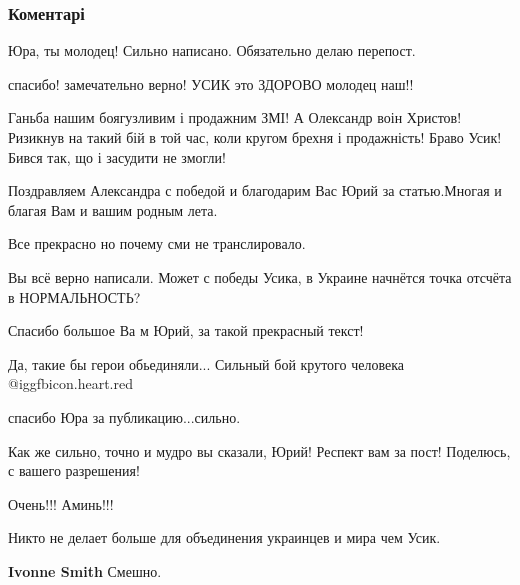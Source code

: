  
 
 
 
 
\subsubsection{Коментарі}

\begin{itemize} %
Юра, ты молодец! Сильно написано. Обязательно делаю перепост.

спасибо! замечательно верно! УСИК это ЗДОРОВО молодец наш!!


Ганьба нашим боягузливим і продажним ЗМІ! А Олександр воін Христов! Ризикнув на
такий бій в той час, коли кругом брехня і продажність! Браво Усик! Бився так,
що і засудити не змогли!


Поздравляем Александра с победой и благодарим Вас Юрий за статью.Многая и благая Вам и вашим родным лета.

Все прекрасно но почему сми не транслировало.

Вы всё верно написали. Может с победы Усика, в Украине начнётся точка отсчёта в НОРМАЛЬНОСТЬ?

Спасибо большое Ва м Юрий, за такой прекрасный текст!

Да, такие бы герои обьединяли... Сильный бой крутого человека @igg{fbicon.heart.red}

спасибо Юра за публикацию...сильно.

Как же сильно, точно и мудро вы сказали, Юрий! Респект вам за пост! Поделюсь, с вашего разрешения!

Очень!!! Аминь!!!

Никто не делает больше для объединения украинцев и мира чем Усик.

\begin{itemize} %
\textbf{Ivonne Smith} Смешно.
\end{itemize} %


\end{itemize}
